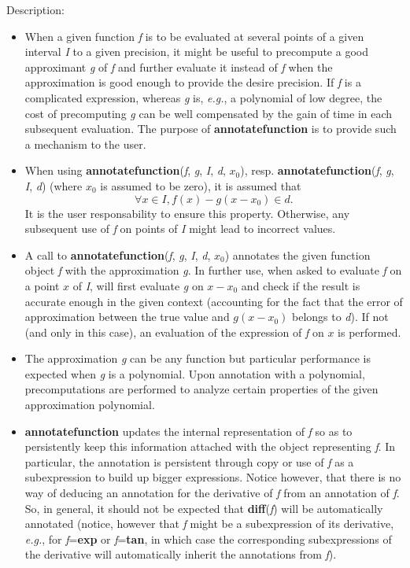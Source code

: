 \noindent Description: \begin{itemize}

\item When a given function \emph{f} is to be evaluated at several points of a given
   interval \emph{I} to a given precision, it might be useful to precompute a good
   approximant \emph{g} of \emph{f} and further evaluate it instead of \emph{f} when the
   approximation is good enough to provide the desire precision. If \emph{f} is a
   complicated expression, whereas \emph{g} is, \emph{e.g.}, a polynomial of low degree,
   the cost of precomputing \emph{g} can be well compensated by the gain of time in
   each subsequent evaluation. The purpose of \textbf{annotatefunction} is to provide
   such a mechanism to the user.

\item When using \textbf{annotatefunction}(\emph{f}, \emph{g}, \emph{I}, \emph{d}, \emph{$x_0$}),
   resp. \textbf{annotatefunction}(\emph{f}, \emph{g}, \emph{I}, \emph{d}) (where \emph{$x_0$} is assumed to be
   zero), it is assumed that
   $$\forall x \in I, f(x) - g(x - x_0) \in d.$$
   It is the user responsability to ensure this property. Otherwise, any
   subsequent use of \emph{f} on points of \emph{I} might lead to incorrect values.

\item A call to \textbf{annotatefunction}(\emph{f}, \emph{g}, \emph{I}, \emph{d}, \emph{$x_0$}) annotates the given
   \sollya function object \emph{f} with the approximation \emph{g}. In further use, when
   asked to evaluate \emph{f} on a point $x$ of \emph{I}, \sollya will first evaluate \emph{g}
   on $x-x_0$ and check if the result is accurate enough in the given context
   (accounting for the fact that the error of approximation between the true
   value and $g(x-x_0)$ belongs to \emph{d}). If not (and only in this case), an
   evaluation of the expression of \emph{f} on $x$ is performed.

\item The approximation \emph{g} can be any \sollya function but particular
   performance is expected when \emph{g} is a polynomial. Upon annotation with a
   polynomial, precomputations are performed to analyze certain properties of
   the given approximation polynomial.

\item \textbf{annotatefunction} updates the internal representation of \emph{f} so as to
   persistently keep this information attached with the \sollya object
   representing \emph{f}. In particular, the annotation is persistent through copy
   or use of \emph{f} as a subexpression to build up bigger expressions. Notice
   however, that there is no way of deducing an annotation for the derivative
   of \emph{f} from an annotation of \emph{f}. So, in general, it should not be expected
   that \textbf{diff}(\emph{f}) will be automatically annotated (notice, however that \emph{f}
   might be a subexpression of its derivative, \emph{e.g.}, for \emph{f}=\textbf{exp} or \emph{f}=\textbf{tan}, in
   which case the corresponding subexpressions of the derivative will
   automatically inherit the annotations from \emph{f}).


\end{itemize}
